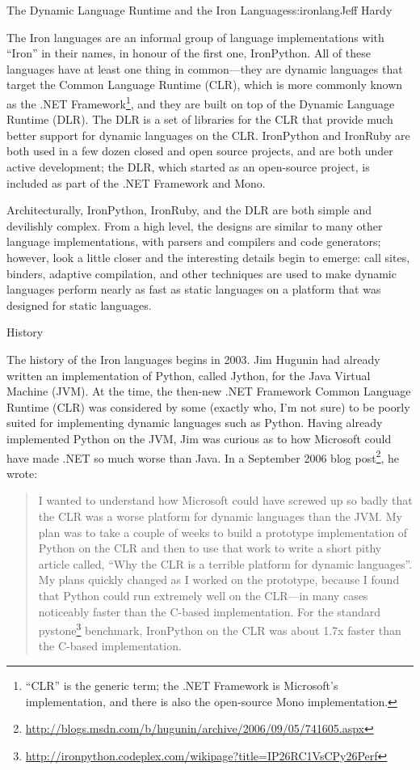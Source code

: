 \begin{aosachapter}{The Dynamic Language Runtime and the Iron Languages}{s:ironlang}{Jeff Hardy}

The Iron languages are an informal group of language implementations with
``Iron'' in their names, in honour of the first one, IronPython. All of these
languages have at least one thing in common---they are dynamic languages that
target
the Common Language Runtime (CLR), which is more commonly known as the .NET
Framework\footnote{``CLR'' is the generic term; the .NET Framework is
Microsoft's implementation, and there is also the open-source Mono
implementation.}, and they are built on top of the Dynamic Language Runtime
(DLR).  The DLR is a set of libraries for the CLR that provide much better
support for dynamic languages on the CLR. IronPython and IronRuby are both used
in a few dozen closed and open source projects, and are both under active
development; the DLR, which started as an open-source project, is included as
part of the .NET Framework and Mono.

Architecturally, IronPython, IronRuby, and the DLR are both simple and
devilishly complex. From a high level, the designs are similar to many other
language implementations, with parsers and compilers and code generators;
however, look a little closer and the interesting details begin to
emerge: call sites, binders, adaptive compilation, and other techniques are
used to make dynamic languages perform nearly as fast as static languages on a
platform that was designed for static languages. 

\begin{aosasect1}{History}

The history of the Iron languages begins in 2003. Jim Hugunin had already
written an implementation of Python, called Jython, for the Java Virtual
Machine (JVM). At the time, the then-new .NET Framework Common Language Runtime
(CLR) was considered by some (exactly who, I'm not sure) to be poorly suited
for implementing dynamic languages such as Python. Having already implemented
Python on the JVM, Jim was curious as to how Microsoft could have made .NET so
much worse than Java. In a September 2006 blog post\footnote{\url{http://blogs.msdn.com/b/hugunin/archive/2006/09/05/741605.aspx}}, he wrote:

\begin{quotation}
I wanted to understand how Microsoft could have screwed up so badly that the
CLR was a worse platform for dynamic languages than the JVM.  My plan was to
take a couple of weeks to build a prototype implementation of Python on the CLR
and then to use that work to write a short pithy article called, ``Why the CLR
is a terrible platform for dynamic languages''.  My plans quickly changed as I
worked on the prototype, because I found that Python could run extremely well
on the CLR---in many cases noticeably faster than the C-based implementation.
For the standard
pystone\footnote{\url{http://ironpython.codeplex.com/wikipage?title=IP26RC1VsCPy26Perf}}
benchmark, IronPython on the CLR was about 1.7x faster than the C-based
implementation.
\end{quotation}


\end{aosasect1}
\end{aosachapter}
